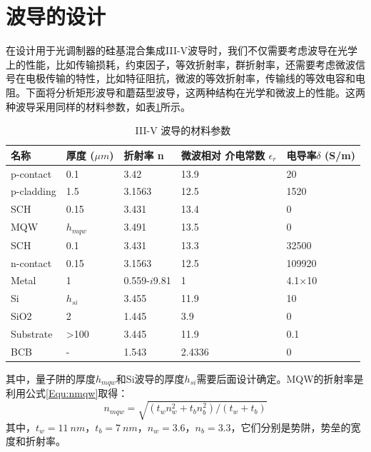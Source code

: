 \section{波导的设计}
在设计用于光调制器的硅基混合集成III-V波导时，我们不仅需要考虑波导在光学上的性能，比如传输损耗，约束因子，等效折射率，群折射率，还需要考虑微波信号在电极传输的特性，比如特征阻抗，微波的等效折射率，传输线的等效电容和电阻。下面将分析矩形波导和蘑菇型波导，这两种结构在光学和微波上的性能。这两种波导采用同样的材料参数，如表\ref{epi_structure}\cite{yongbophd}所示。
{
	\begin{table}[htb]
		\caption{III-V 波导的材料参数}
		\label{epi_structure}
		\centering
		\begin{tabular}[t]{lllll}
			\hline
			名称 & 厚度 ($\mu m$) & 折射率 n& \tabincell{l}{微波相对 \\ 介电常数 $\epsilon_r$} & 电导率$\delta$ (S/m) \\
			\hline
			p-contact & 0.1 & 3.42 & 13.9 & 20 \\
			p-cladding  & 1.5 & 3.1563 & 12.5 & 1520 \\
			SCH & 0.15 & 3.431 & 13.4 & 0 \\
			MQW & $h_{mqw}$ & 3.491 & 13.5 & 0 \\
			SCH & 0.1 & 3.431 & 13.3 & 32500\\
			n-contact & 0.15 & 3.1563 & 12.5 & 109920 \\
			Metal & 1 & 0.559-$i$9.81 & 1 & 4.1$\times$10\SP{7}\\
			Si & $h_{si}$&3.455 & 11.9 & 10  \\
			SiO2 & 2 & 1.445 & 3.9 & 0\\
			Substrate & >100 & 3.445 & 11.9 & 0.1\\
			BCB & - &1.543 & 2.4336 &0 \\
			\hline
		\end{tabular}
	\end{table}
}

其中，量子阱的厚度$h_{mqw}$和Si波导的厚度$h_{si}$需要后面设计确定。MQW的折射率是利用公式\ref{Equ:nmqw}取得：
\begin{equation}
\label{Equ:nmqw}
n_{mqw}=\sqrt{(t_w n_w^2+t_b n_b^2)/(t_w+t_b)}
\end{equation}
其中，$t_w = 11~nm$，$t_b =7~nm$，$n_w = 3.6$，$n_b = 3.3$，它们分别是势阱，势垒的宽度和折射率。
